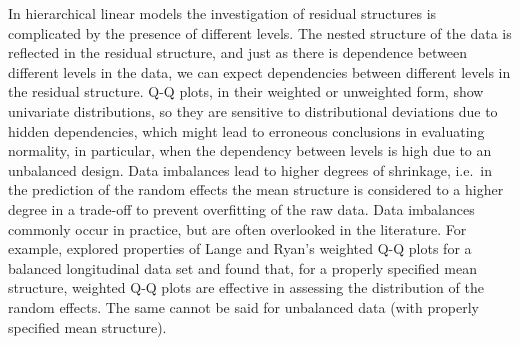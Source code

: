 \documentclass[12pt]{article} %
\newcommand{\hh}[1]{{\color{orange} #1}}
\newcommand{\al}[1]{{\color{red} #1}}
\begin{document}

In hierarchical linear models the investigation of residual structures is complicated by the presence of  different levels. 
The nested structure of the data is reflected in the residual structure, and just as there is dependence between different levels in the data, we can expect dependencies between different levels in the residual structure. 
Q-Q plots, in their weighted \citep{Dempster:1985tr, Lange:1989uu} or unweighted {form},  show univariate distributions, so they are sensitive to distributional deviations due to hidden dependencies, which might lead to erroneous conclusions in evaluating normality, in particular, when the dependency between levels is high due to an unbalanced design. %
Data imbalances lead to higher degrees of shrinkage, i.e.~in the prediction of the random effects the mean structure is considered to a higher degree in a trade-off to prevent overfitting of the raw data.
Data imbalances commonly occur in practice, but are often overlooked in the literature. For example, \cite{Eberly:2005ee} explored properties of Lange and Ryan's weighted Q-Q plots for a balanced longitudinal data set and found that, for a properly specified mean structure,  weighted Q-Q plots are effective in  assessing the distribution of the random effects. The same cannot be said for unbalanced data (with properly specified mean structure). %


\end{document}
